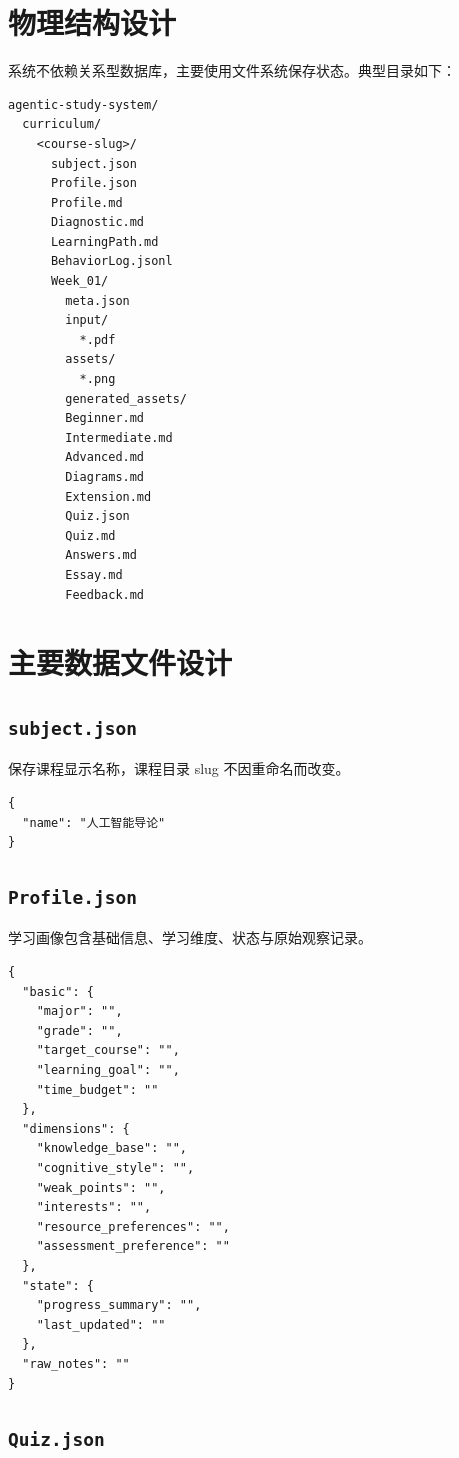 \documentclass[UTF8,fontset=windows,zihao=-4,openany]{ctexrep}
\begin{document}
\section{物理结构设计}

系统不依赖关系型数据库，主要使用文件系统保存状态。典型目录如下：

\begin{lstlisting}
agentic-study-system/
  curriculum/
    <course-slug>/
      subject.json
      Profile.json
      Profile.md
      Diagnostic.md
      LearningPath.md
      BehaviorLog.jsonl
      Week_01/
        meta.json
        input/
          *.pdf
        assets/
          *.png
        generated_assets/
        Beginner.md
        Intermediate.md
        Advanced.md
        Diagrams.md
        Extension.md
        Quiz.json
        Quiz.md
        Answers.md
        Essay.md
        Feedback.md
\end{lstlisting}

\section{主要数据文件设计}

\subsection{\texttt{subject.json}}

保存课程显示名称，课程目录 slug 不因重命名而改变。
\begin{lstlisting}
{
  "name": "人工智能导论"
}
\end{lstlisting}

\subsection{\texttt{Profile.json}}

学习画像包含基础信息、学习维度、状态与原始观察记录。
\begin{lstlisting}
{
  "basic": {
    "major": "",
    "grade": "",
    "target_course": "",
    "learning_goal": "",
    "time_budget": ""
  },
  "dimensions": {
    "knowledge_base": "",
    "cognitive_style": "",
    "weak_points": "",
    "interests": "",
    "resource_preferences": "",
    "assessment_preference": ""
  },
  "state": {
    "progress_summary": "",
    "last_updated": ""
  },
  "raw_notes": ""
}
\end{lstlisting}

\subsection{\texttt{Quiz.json}}
\end{document}
